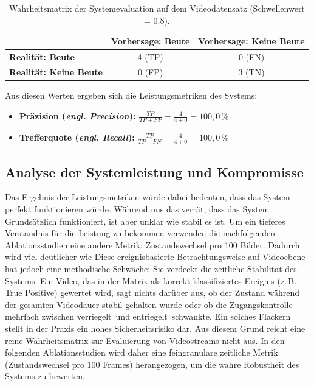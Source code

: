 \begin{table}[H]
    \centering
    \begin{tabular}{|l|c|c|}
        \hline
         & \textbf{Vorhersage: Beute} & \textbf{Vorhersage: Keine Beute} \\
        \hline
        \textbf{Realität: Beute} & 4 (TP) & 0 (FN) \\
        \hline
        \textbf{Realität: Keine Beute} & 0 (FP) & 3 (TN) \\
        \hline
    \end{tabular}
    \caption{Wahrheitsmatrix der Systemevaluation auf dem Videodatensatz (Schwellenwert = 0.8).}
    \label{tab:system_eval}
\end{table}

Aus diesen Werten ergeben sich die Leistungsmetriken des Systems:

\begin{itemize}
    \item \textbf{Präzision (\emph{engl. Precision}):} $\frac{TP}{TP+FP} = \frac{4}{4+0} = 100,0\,\%$
    \item \textbf{Trefferquote (\emph{engl. Recall}):} $\frac{TP}{TP+FN} = \frac{4}{4+0} = 100,0\,\%$
\end{itemize}

\subsection{Analyse der Systemleistung und Kompromisse}
Das Ergebnis der Leistungsmetriken würde dabei bedeuten, dass das System perfekt funktionieren würde. Während uns das verrät, dass das System Grundsätzlich funktioniert, ist aber unklar wie stabil es ist. Um ein tieferes Verständnis für die Leistung zu bekommen verwenden die nachfolgenden Ablationsstudien eine andere Metrik: Zustandswechsel pro 100 Bilder. Dadurch wird viel deutlicher wie 
Diese ereignisbasierte Betrachtungsweise auf Videoebene hat jedoch eine methodische Schwäche: Sie verdeckt die zeitliche Stabilität des Systems. Ein Video, das in der Matrix als korrekt klassifiziertes Ereignis (z.\,B. True Positive) gewertet wird, sagt nichts darüber aus, ob der Zustand während der gesamten Videodauer stabil gehalten wurde oder ob die Zugangskontrolle mehrfach zwischen \glqq verriegelt\grqq\ und \glqq entriegelt\grqq\ schwankte. Ein solches Flackern stellt in der Praxis ein hohes Sicherheitsrisiko dar. Aus diesem Grund reicht eine reine Wahrheitsmatrix zur Evaluierung von Videostreams nicht aus. In den folgenden Ablationsstudien wird daher eine feingranulare zeitliche Metrik (Zustandswechsel pro 100 Frames) herangezogen, um die wahre Robustheit des Systems zu bewerten.


